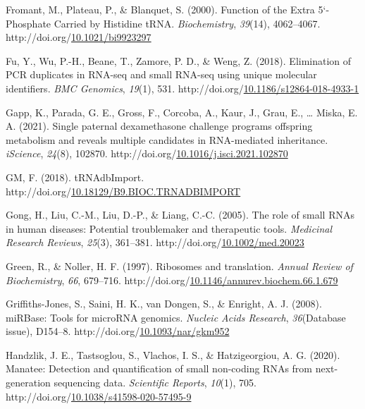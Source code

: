 \documentclass[12pt,twoside]{reedthesis}
\newlength{\cslhangindent}
\newenvironment{CSLReferences}[2] %
 {%
  \setlength{\parindent}{0pt}
  \ifodd #1 \everypar{\setlength{\hangindent}{\cslhangindent}}\ignorespaces\fi
  \ifnum #2 > 0
  \setlength{\parskip}{#2\baselineskip}
  \fi
 }%
 {}
\begin{document}
\begin{CSLReferences}{1}{0}
\leavevmode{}%
Fromant, M., Plateau, P., \& Blanquet, S. (2000). Function of the Extra 5{`}-Phosphate Carried by Histidine tRNA. \emph{Biochemistry}, \emph{39}(14), 4062--4067. http://doi.org/\href{https://doi.org/10.1021/bi9923297}{10.1021/bi9923297}

\leavevmode{}%
Fu, Y., Wu, P.-H., Beane, T., Zamore, P. D., \& Weng, Z. (2018). Elimination of PCR duplicates in RNA-seq and small RNA-seq using unique molecular identifiers. \emph{BMC Genomics}, \emph{19}(1), 531. http://doi.org/\href{https://doi.org/10.1186/s12864-018-4933-1}{10.1186/s12864-018-4933-1}

\leavevmode{}%
Gapp, K., Parada, G. E., Gross, F., Corcoba, A., Kaur, J., Grau, E., \ldots{} Miska, E. A. (2021). Single paternal dexamethasone challenge programs offspring metabolism and reveals multiple candidates in RNA-mediated inheritance. \emph{iScience}, \emph{24}(8), 102870. http://doi.org/\href{https://doi.org/10.1016/j.isci.2021.102870}{10.1016/j.isci.2021.102870}

\leavevmode{}%
GM, F. (2018). tRNAdbImport. http://doi.org/\href{https://doi.org/10.18129/B9.BIOC.TRNADBIMPORT}{10.18129/B9.BIOC.TRNADBIMPORT}

\leavevmode{}%
Gong, H., Liu, C.-M., Liu, D.-P., \& Liang, C.-C. (2005). The role of small RNAs in human diseases: Potential troublemaker and therapeutic tools. \emph{Medicinal Research Reviews}, \emph{25}(3), 361--381. http://doi.org/\href{https://doi.org/10.1002/med.20023}{10.1002/med.20023}

\leavevmode{}%
Green, R., \& Noller, H. F. (1997). Ribosomes and translation. \emph{Annual Review of Biochemistry}, \emph{66}, 679--716. http://doi.org/\href{https://doi.org/10.1146/annurev.biochem.66.1.679}{10.1146/annurev.biochem.66.1.679}

\leavevmode{}%
Griffiths-Jones, S., Saini, H. K., van Dongen, S., \& Enright, A. J. (2008). miRBase: Tools for microRNA genomics. \emph{Nucleic Acids Research}, \emph{36}(Database issue), D154--8. http://doi.org/\href{https://doi.org/10.1093/nar/gkm952}{10.1093/nar/gkm952}

\leavevmode{}%
Handzlik, J. E., Tastsoglou, S., Vlachos, I. S., \& Hatzigeorgiou, A. G. (2020). Manatee: Detection and quantification of small non-coding RNAs from next-generation sequencing data. \emph{Scientific Reports}, \emph{10}(1), 705. http://doi.org/\href{https://doi.org/10.1038/s41598-020-57495-9}{10.1038/s41598-020-57495-9}


\end{CSLReferences}
\end{document}
